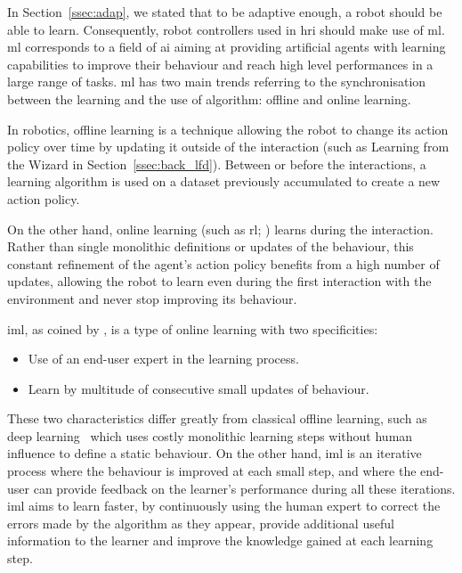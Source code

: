 In Section~\ref{ssec:adap}, we stated that to be adaptive enough, a robot should be able to learn. Consequently, robot controllers used in \gls{hri} should make use of \acrfull{ml}. 
\gls{ml} corresponds to a field of \gls{ai} aiming at providing artificial agents with learning capabilities to improve their behaviour and reach high level performances in a large range of tasks. \gls{ml} has two main trends referring to the synchronisation between the learning and the use of algorithm: offline and online learning.

In robotics, offline learning is a technique allowing the robot to change its action policy over time by updating it outside of the interaction (such as Learning from the Wizard in Section~\ref{ssec:back_lfd}). Between or before the interactions, a learning algorithm is used on a dataset previously accumulated to create a new action policy.

On the other hand, online learning (such as \gls{rl}; \citealt{sutton1998reinforcement}) learns during the interaction. Rather than single monolithic definitions or updates of the behaviour, this constant refinement of the agent's action policy benefits from a high number of updates, allowing the robot to learn even during the first interaction with the environment and never stop improving its behaviour.

\acrfull{iml}, as coined by \cite{fails2003interactive}, is a type of online learning with two specificities:
\begin{itemize}
	\item Use of an end-user expert in the learning process.
	\item Learn by multitude of consecutive small updates of behaviour.
\end{itemize}
These two characteristics differ greatly from classical offline learning, such as deep learning~\citep{lecun2015deep} which uses costly monolithic learning steps without human influence to define a static behaviour. On the other hand, \gls{iml} is an iterative process where the behaviour is improved at each small step, and where the end-user can provide feedback on the learner's performance during all these iterations. \gls{iml} aims to learn faster, by continuously using the human expert to correct the errors made by the algorithm as they appear, provide additional useful information to the learner and improve the knowledge gained at each learning step.

